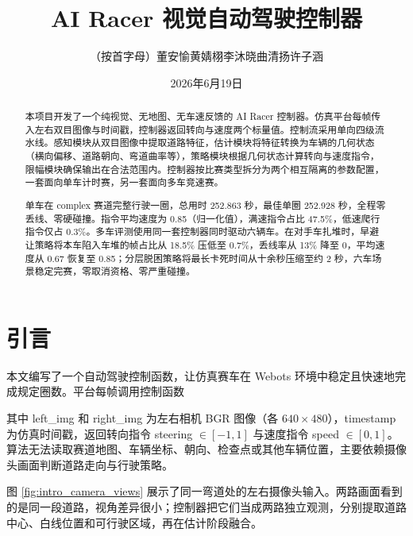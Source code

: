 \documentclass[UTF8,a4paper]{ctexart}
\title{AI Racer 视觉自动驾驶控制器}
\author{（按首字母）董安愉\quad 黄婧栩\quad 李沐晓\quad 曲清扬\quad 许子涵}
\date{2026年6月19日}
\begin{document}
\pagestyle{plain}
\maketitle

\begin{abstract}
本项目开发了一个纯视觉、无地图、无车速反馈的 AI Racer 控制器。仿真平台每帧传入左右双目图像与时间戳，控制器返回转向与速度两个标量值。控制流采用单向四级流水线。感知模块从双目图像中提取道路特征，估计模块将特征转换为车辆的几何状态（横向偏移、道路朝向、弯道曲率等），策略模块根据几何状态计算转向与速度指令，限幅模块确保输出在合法范围内。控制器按比赛类型拆分为两个相互隔离的参数配置，一套面向单车计时赛，另一套面向多车竞速赛。

单车在 complex 赛道完整行驶一圈，总用时 252.863 秒，最佳单圈 252.928 秒，全程零丢线、零硬碰撞。指令平均速度为 0.85（归一化值），满速指令占比 47.5\%，低速爬行指令仅占 0.3\%。多车评测使用同一套控制器同时驱动六辆车。在对手车扎堆时，早避让策略将本车陷入车堆的帧占比从 18.5\% 压低至 0.7\%，丢线率从 13\% 降至 0，平均速度从 0.67 恢复至 0.85；分层脱困策略将最长卡死时间从十余秒压缩至约 2 秒，六车场景稳定完赛，零取消资格、零严重碰撞。
\end{abstract}

\section{引言}

本文编写了一个自动驾驶控制函数，让仿真赛车在 Webots 环境中稳定且快速地完成规定圈数。平台每帧调用控制函数

\begin{center}
\end{center}

其中 left\_img 和 right\_img 为左右相机 BGR 图像（各 $640\times480$），timestamp 为仿真时间戳，返回转向指令 steering $\in [-1,1]$ 与速度指令 speed $\in [0,1]$。算法无法读取赛道地图、车辆坐标、朝向、检查点或其他车辆位置，主要依赖摄像头画面判断道路走向与行驶策略。

图 \ref{fig:intro_camera_views} 展示了同一弯道处的左右摄像头输入。两路画面看到的是同一段道路，视角差异很小；控制器把它们当成两路独立观测，分别提取道路中心、白线位置和可行驶区域，再在估计阶段融合。
\end{document}
